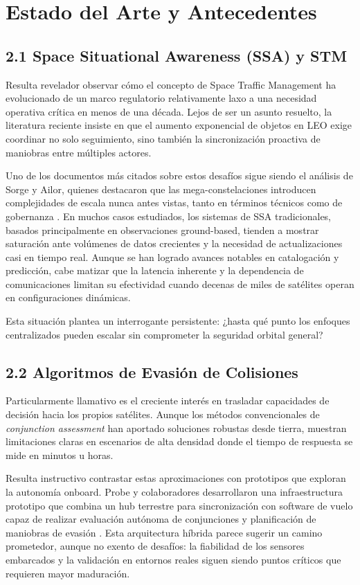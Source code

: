 \section{Estado del Arte y Antecedentes}

\subsection{2.1 Space Situational Awareness (SSA) y STM}

Resulta revelador observar cómo el concepto de Space Traffic Management ha evolucionado de un marco regulatorio relativamente laxo a una necesidad operativa crítica en menos de una década. Lejos de ser un asunto resuelto, la literatura reciente insiste en que el aumento exponencial de objetos en LEO exige coordinar no solo seguimiento, sino también la sincronización proactiva de maniobras entre múltiples actores.

Uno de los documentos más citados sobre estos desafíos sigue siendo el análisis de Sorge y Ailor, quienes destacaron que las mega-constelaciones introducen complejidades de escala nunca antes vistas, tanto en términos técnicos como de gobernanza \cite{sorge2020stm}. En muchos casos estudiados, los sistemas de SSA tradicionales, basados principalmente en observaciones ground-based, tienden a mostrar saturación ante volúmenes de datos crecientes y la necesidad de actualizaciones casi en tiempo real. Aunque se han logrado avances notables en catalogación y predicción, cabe matizar que la latencia inherente y la dependencia de comunicaciones limitan su efectividad cuando decenas de miles de satélites operan en configuraciones dinámicas.

Esta situación plantea un interrogante persistente: ¿hasta qué punto los enfoques centralizados pueden escalar sin comprometer la seguridad orbital general?

\subsection{2.2 Algoritmos de Evasión de Colisiones}

Particularmente llamativo es el creciente interés en trasladar capacidades de decisión hacia los propios satélites. Aunque los métodos convencionales de \emph{conjunction assessment} han aportado soluciones robustas desde tierra, muestran limitaciones claras en escenarios de alta densidad donde el tiempo de respuesta se mide en minutos u horas.

Resulta instructivo contrastar estas aproximaciones con prototipos que exploran la autonomía onboard. Probe y colaboradores desarrollaron una infraestructura prototipo que combina un hub terrestre para sincronización con software de vuelo capaz de realizar evaluación autónoma de conjunciones y planificación de maniobras de evasión \cite{probe2022autonomous}. Esta arquitectura híbrida parece sugerir un camino prometedor, aunque no exento de desafíos: la fiabilidad de los sensores embarcados y la validación en entornos reales siguen siendo puntos críticos que requieren mayor maduración.

